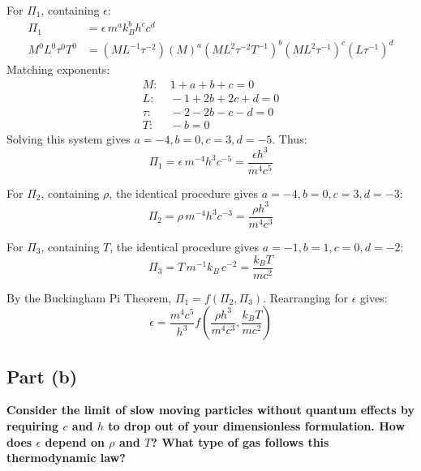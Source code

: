 \documentclass[12pt]{article}
\begin{document}
For $\Pi_1$, containing $\epsilon$:
\begin{align*}
    \Pi_1 &= \epsilon\, m^a k_B^b h^c c^d \\
    M^0 L^0 \tau^0 T^0 &= (M L^{-1} \tau^{-2})(M)^a (M L^2 \tau^{-2} T^{-1})^b (M L^2 \tau^{-1})^c (L \tau^{-1})^d
\end{align*}
Matching exponents:
\begin{align*}
    M:&\ 1 + a + b + c = 0 \\
    L:&\ -1 + 2b + 2c + d = 0 \\
    \tau:&\ -2 -2b - c - d = 0 \\
    T:&\ -b = 0
\end{align*}
Solving this system gives $a = -4, b = 0, c = 3, d = -5$. Thus:
\begin{equation}
    \Pi_1 = \epsilon\, m^{-4} h^3 c^{-5} = \frac{\epsilon h^3}{m^4 c^5}
\end{equation}

For $\Pi_2$, containing $\rho$, the identical procedure gives $a = -4, b = 0, c = 3, d = -3$:
\begin{equation}
    \Pi_2 = \rho\, m^{-4} h^3 c^{-3} = \frac{\rho h^3}{m^4 c^3}
\end{equation}

For $\Pi_3$, containing $T$, the identical procedure gives $a = -1, b = 1, c = 0, d = -2$:
\begin{equation}
    \Pi_3 = T\, m^{-1} k_B\, c^{-2} = \frac{k_B T}{m c^2}
\end{equation}

By the Buckingham Pi Theorem, $\Pi_1 = f(\Pi_2, \Pi_3)$. Rearranging for $\epsilon$ gives:
\begin{equation}
    \boxed{
    \epsilon = \frac{m^4 c^5}{h^3} f\left(\frac{\rho h^3}{m^4 c^3}, \frac{k_B T}{m c^2}\right)
    }
\end{equation}

\subsection*{Part (b)}
\textbf{Consider the limit of slow moving particles without quantum effects by requiring $c$ and $h$ to drop out of your dimensionless formulation. How does $\epsilon$ depend on $\rho$ and $T$? What type of gas follows this thermodynamic law?}
\end{document}
